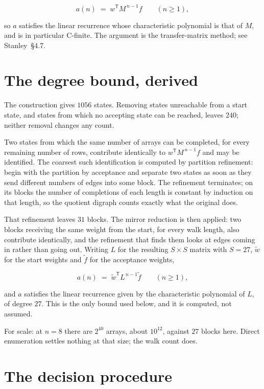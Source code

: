 \documentclass[11pt]{article}
\theoremstyle{definition}
\begin{document}
\[a(n) \;=\; w^{\mathsf T} M^{\,n-1} f \qquad (n \ge 1),\]

so $a$ satisfies the linear recurrence whose characteristic polynomial is that of $M$, and is in particular C-finite. The argument is the transfer-matrix method; see Stanley~\S4.7.

\section{The degree bound, derived}

The construction gives $1056$ states. Removing states unreachable from a start state, and states from which no accepting state can be reached, leaves $240$; neither removal changes any count.

Two states from which the same number of arrays can be completed, for every remaining number of rows, contribute identically to $w^{\mathsf T}M^{\,n-1}f$ and may be identified. The coarsest such identification is computed by partition refinement: begin with the partition by acceptance and separate two states as soon as they send different numbers of edges into some block. The refinement terminates; on its blocks the number of completions of each length is constant by induction on that length, so the quotient digraph counts exactly what the original does.

That refinement leaves $31$ blocks. The mirror reduction is then applied: two blocks receiving the same weight from the start, for every walk length, also contribute identically, and the refinement that finds them looks at edges coming in rather than going out. Writing $L$ for the resulting $S \times S$ matrix with $S = 27$, $\tilde w$ for the start weights and $\tilde f$ for the acceptance weights,

\[a(n) \;=\; \tilde w^{\mathsf T} L^{\,n-1} \tilde f \qquad (n \ge 1),\]

and $a$ satisfies the linear recurrence given by the characteristic polynomial of $L$, of degree $27$. This is the only bound used below, and it is computed, not assumed.

For scale: at $n = 8$ there are $2^{40}$ arrays, about $10^{12}$, against $27$ blocks here. Direct enumeration settles nothing at that size; the walk count does.

\section{The decision procedure}
\end{document}
